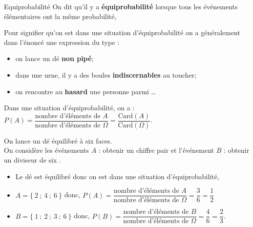 \documentclass[10pt,a4paper,openany,twoside, prof]{book}
\begin{document}
\begin{defi}{Equiprobabilité}{}
On dit qu'il y a \textbf{équiprobabilité} lorsque tous les événements élémentaires ont la même probabilité,

   Pour signifier qu'on est dans une situation d'équiprobabilité on a généralement dans l'énoncé une expression du type :
   \begin{itemize}
      \item  on lance un dé \textbf{non pipé};
      \item  dans une urne, il y a des boules \textbf{indiscernables} au toucher;
      \item  on rencontre au \textbf{hasard} une personne parmi \dots
   \end{itemize}
\end{defi}

\begin{prop}{}{}
Dans une situation d'équiprobabilité, on a : $P(A) =\dfrac{\textrm{nombre d'éléments de }A}{\textrm{nombre d'éléments de }\Omega} =\dfrac{\textrm{Card}(A)}{\textrm{Card}(\Omega)}$.
\end{prop}

\begin{ex}{}{}
  On lance un dé équilibré à six faces. \\
  On considère les événements $A$ : \og obtenir un chiffre pair \fg{} et l'événement $B$ : \og obtenir un diviseur de six \fg{}.
   \begin{itemize}
      \item[] Le dé est équilibré donc on est dans une situation d'équiprobabilité,
      \item[] $A=\{~2~;~4~;~6~\}$ \quad donc, $P(A)=\dfrac{\textrm{nombre d'éléments de }A}{\textrm{nombre d'éléments de }\Omega} =\dfrac{3}{6}=\dfrac{1}{2}$
      \item[] $B=\{~1~;~2~;~3~;~6~\}$ \quad donc, $P(B)=\dfrac{\textrm{nombre d'éléments de }B}{\textrm{nombre d'éléments de }\Omega} =\dfrac{4}{6}=\dfrac{2}{3}$.
   \end{itemize}
\end{ex}
\end{document}
